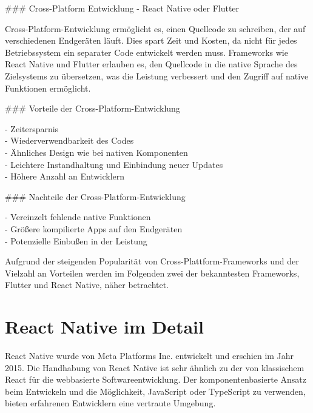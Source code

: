 \documentclass[a4paper,12pt]{article}
\begin{document}
\vspace{0.5cm}

### Cross-Platform Entwicklung - React Native oder Flutter

Cross-Platform-Entwicklung ermöglicht es, einen Quellcode zu schreiben, der auf verschiedenen Endgeräten läuft. Dies spart Zeit und Kosten, da nicht für jedes Betriebssystem ein separater Code entwickelt werden muss. Frameworks wie React Native und Flutter erlauben es, den Quellcode in die native Sprache des Zielsystems zu übersetzen, was die Leistung verbessert und den Zugriff auf native Funktionen ermöglicht.

\vspace{0.5cm}

### Vorteile der Cross-Platform-Entwicklung

- Zeitersparnis \\
- Wiederverwendbarkeit des Codes \\
- Ähnliches Design wie bei nativen Komponenten \\
- Leichtere Instandhaltung und Einbindung neuer Updates \\
- Höhere Anzahl an Entwicklern

\vspace{0.5cm}

### Nachteile der Cross-Platform-Entwicklung

- Vereinzelt fehlende native Funktionen \\
- Größere kompilierte Apps auf den Endgeräten \\
- Potenzielle Einbußen in der Leistung

\vspace{0.5cm}

Aufgrund der steigenden Popularität von Cross-Plattform-Frameworks und der Vielzahl an Vorteilen werden im Folgenden zwei der bekanntesten Frameworks, Flutter und React Native, näher betrachtet.


\section{React Native im Detail}
React Native wurde von Meta Platforms Inc. entwickelt und erschien im Jahr 2015. Die Handhabung von React Native ist sehr ähnlich zu der von klassischem React für die webbasierte Softwareentwicklung. Der komponentenbasierte Ansatz beim Entwickeln und die Möglichkeit, JavaScript oder TypeScript zu verwenden, bieten erfahrenen Entwicklern eine vertraute Umgebung. 

\vspace{0.5cm}
\end{document}

